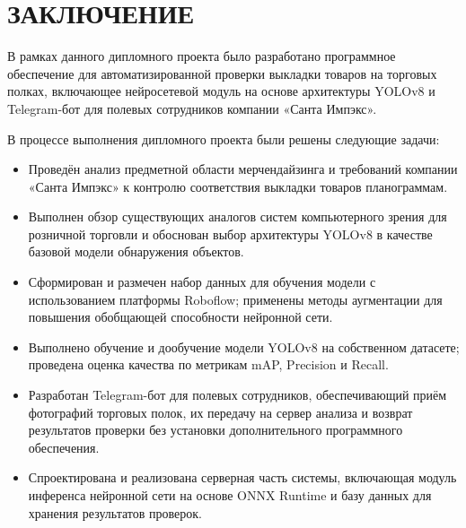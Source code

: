 \sectionbreak \section*{
	\gostTitleFont
	\redline
	ЗАКЛЮЧЕНИЕ
}

\subtitlespace

{\gostFont
	\par \redline В рамках данного дипломного проекта было разработано программное обеспечение для автоматизированной проверки выкладки товаров на торговых полках, включающее нейросетевой модуль на основе архитектуры YOLOv8 и Telegram-бот для полевых сотрудников компании «Санта Импэкс».

    \par \redline В процессе выполнения дипломного проекта были решены следующие задачи:
	
	\begin{itemize}[leftmargin=2.15cm, labelwidth=0.65cm, labelsep=0.0cm] 
		
		\item[\theitemcntr.] Проведён анализ предметной области мерчендайзинга и требований компании «Санта Импэкс» к контролю соответствия выкладки товаров планограммам.
		\addtocounter{itemcntr}{1}
		
		\item[\theitemcntr.] Выполнен обзор существующих аналогов систем компьютерного зрения для розничной торговли и обоснован выбор архитектуры YOLOv8 в качестве базовой модели обнаружения объектов.
		\addtocounter{itemcntr}{1}
		
		\item[\theitemcntr.] Сформирован и размечен набор данных для обучения модели с использованием платформы Roboflow; применены методы аугментации для повышения обобщающей способности нейронной сети.
		\addtocounter{itemcntr}{1}
		
		\item[\theitemcntr.] Выполнено обучение и дообучение модели YOLOv8 на собственном датасете; проведена оценка качества по метрикам mAP, Precision и Recall.
		\addtocounter{itemcntr}{1}
		
		\item[\theitemcntr.] Разработан Telegram-бот для полевых сотрудников, обеспечивающий приём фотографий торговых полок, их передачу на сервер анализа и возврат результатов проверки без установки дополнительного программного обеспечения.
		\addtocounter{itemcntr}{1}
		
		\item[\theitemcntr.] Спроектирована и реализована серверная часть системы, включающая модуль инференса нейронной сети на основе ONNX Runtime и базу данных для хранения результатов проверок.
		\addtocounter{itemcntr}{1}
		

\end{itemize}}
